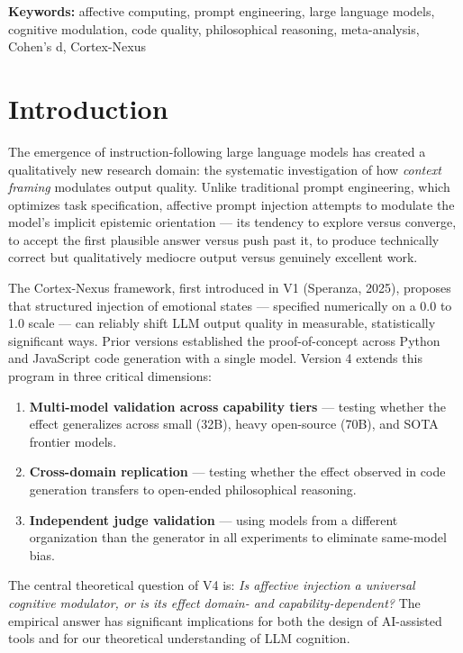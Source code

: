 \documentclass[12pt, a4paper]{article}
\begin{document}
\textbf{Keywords:} affective computing, prompt engineering, large language models, cognitive modulation, code quality, philosophical reasoning, meta-analysis, Cohen's d, Cortex-Nexus

\newpage

\section{Introduction}

The emergence of instruction-following large language models has created a qualitatively new research domain: the systematic investigation of how \textit{context framing} modulates output quality. Unlike traditional prompt engineering, which optimizes task specification, affective prompt injection attempts to modulate the model's implicit epistemic orientation — its tendency to explore versus converge, to accept the first plausible answer versus push past it, to produce technically correct but qualitatively mediocre output versus genuinely excellent work.

The Cortex-Nexus framework, first introduced in V1 (Speranza, 2025), proposes that structured injection of emotional states — specified numerically on a 0.0 to 1.0 scale — can reliably shift LLM output quality in measurable, statistically significant ways. Prior versions established the proof-of-concept across Python and JavaScript code generation with a single model. Version 4 extends this program in three critical dimensions:

\begin{enumerate}
  \item \textbf{Multi-model validation across capability tiers} — testing whether the effect generalizes across small (32B), heavy open-source (70B), and SOTA frontier models.
  \item \textbf{Cross-domain replication} — testing whether the effect observed in code generation transfers to open-ended philosophical reasoning.
  \item \textbf{Independent judge validation} — using models from a different organization than the generator in all experiments to eliminate same-model bias.
\end{enumerate}

The central theoretical question of V4 is: \textit{Is affective injection a universal cognitive modulator, or is its effect domain- and capability-dependent?} The empirical answer has significant implications for both the design of AI-assisted tools and for our theoretical understanding of LLM cognition.
\end{document}
